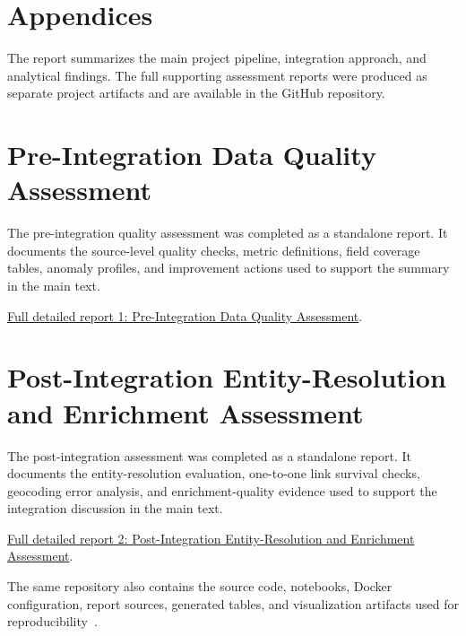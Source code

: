 \chapter*{Appendices}
{}

The report summarizes the main project pipeline, integration approach,
and analytical findings. The full supporting assessment reports were produced
as separate project artifacts and are available in the GitHub repository.

\chapter{Pre-Integration Data Quality Assessment}
\label{app:pre-integration-quality}

The pre-integration quality assessment was completed as a standalone report. It
documents the source-level quality checks, metric definitions, field coverage
tables, anomaly profiles, and improvement actions used to support the summary in
the main text.

\noindent\href{https://github.com/Laimon99/data-management-project/blob/main/deliverables/assessments/pre-integration-quality-report.pdf}{Full detailed report 1: Pre-Integration Data Quality Assessment}.

\chapter{Post-Integration Entity-Resolution and Enrichment Assessment}
\label{app:post-integration-assessment}

The post-integration assessment was completed as a standalone report. It
documents the entity-resolution evaluation, one-to-one link survival checks,
geocoding error analysis, and enrichment-quality evidence used to support the
integration discussion in the main text.

\noindent\href{https://github.com/Laimon99/data-management-project/blob/main/deliverables/assessments/post-integration-quality-report.pdf}{Full detailed report 2: Post-Integration Entity-Resolution and Enrichment Assessment}.

The same repository also contains the source code, notebooks, Docker
configuration, report sources, generated tables, and visualization artifacts
used for reproducibility~\cite{project-repo}.
